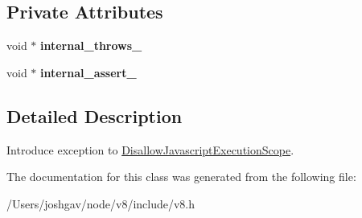 \subsection*{Private Attributes}
\begin{DoxyCompactItemize}
\item 
void $\ast$ {\bfseries internal\+\_\+throws\+\_\+}\hypertarget{classv8_1_1_isolate_1_1_allow_javascript_execution_scope_a991c6fdbad58aae983e2107de2423f80}{}\label{classv8_1_1_isolate_1_1_allow_javascript_execution_scope_a991c6fdbad58aae983e2107de2423f80}

\item 
void $\ast$ {\bfseries internal\+\_\+assert\+\_\+}\hypertarget{classv8_1_1_isolate_1_1_allow_javascript_execution_scope_a5ef196e5ce1c7c3602b3bbe4674dab3c}{}\label{classv8_1_1_isolate_1_1_allow_javascript_execution_scope_a5ef196e5ce1c7c3602b3bbe4674dab3c}

\end{DoxyCompactItemize}


\subsection{Detailed Description}
Introduce exception to \hyperlink{classv8_1_1_isolate_1_1_disallow_javascript_execution_scope}{Disallow\+Javascript\+Execution\+Scope}. 

The documentation for this class was generated from the following file\+:\begin{DoxyCompactItemize}
\item 
/\+Users/joshgav/node/v8/include/v8.\+h\end{DoxyCompactItemize}
